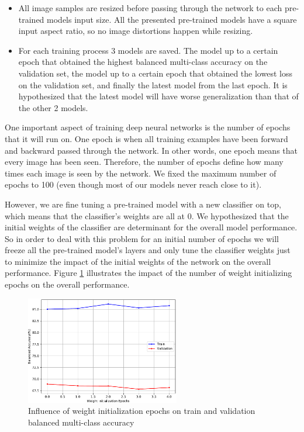 \begin{itemize}
        \item All image samples are resized before passing through the network to each pre-trained models input size. All the presented pre-trained models have a square input aspect ratio, so no image distortions happen while resizing.
        \item For each training process 3 models are saved. The model up to a certain epoch that obtained the highest balanced multi-class accuracy on the validation set, the model up to a certain epoch that obtained the lowest loss on the validation set, and finally the latest model from the last epoch. It is hypothesized that the latest model will have worse generalization than that of the other 2 models. 
    \end{itemize}
    
    One important aspect of training deep neural networks is the number of epochs that it will run on. One epoch is when all training examples have been forward and backward passed through the network. In other words, one epoch means that every image has been seen. Therefore, the number of epochs define how many times each image is seen by the network. We fixed the maximum number of epochs to 100 (even though most of our models never reach close to it). \par
    
    However, we are fine tuning a pre-trained model with a new classifier on top, which means that the classifier's weights are all at 0. We hypothesized that the initial weights of the classifier are determinant for the overall model performance. So in order to deal with this problem for an initial number of epochs we will freeze all the pre-trained model's layers and only tune the classifier weights just to minimize the impact of the initial weights of the network on the overall performance. Figure \ref{fig:wiepochs_comp} illustrates the impact of the number of weight initializing epochs on the overall performance. \par
    \begin{figure}[ht]
        \centering
        \includegraphics[width=0.6\textwidth]{figs/densenet201_wiepochs_comp.pdf}
        \caption{Influence of weight initialization epochs on train and validation balanced multi-class accuracy}
        \label{fig:wiepochs_comp}
    \end{figure}
    
